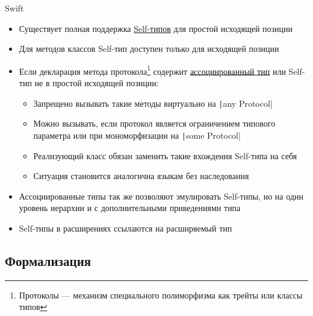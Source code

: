 \documentclass[aspectratio=169,usenames,dvipsnames]{beamer}
\begin{document}
    \begin{frame}{Swift}
        \begin{itemize}
            \item Существует полная поддержка \href{https://docs.swift.org/swift-book/documentation/the-swift-programming-language/types/\#Self-Type}{\color{blue}Self-типов} для простой исходящей позиции
            \item Для методов классов Self-тип доступен только для исходящей позиции
            \item Если декларация метода протокола\footnote{Протоколы --- механизм специального полиморфизма как трейты или классы типов} содержит \href{https://docs.swift.org/swift-book/documentation/the-swift-programming-language/generics/\#Associated-Types}{\color{blue}ассоциированный тип} или Self-тип не в простой исходящей позиции:
            \begin{itemize}
                \item Запрещено вызывать такие методы виртуально на \texttt|any Protocol|
                \item Можно вызывать, если протокол является ограничением типового параметра или при мономорфизации на \texttt|some Protocol|
                \item Реализующий класс обязан заменить такие вхождения Self-типа на себя
                \item Ситуация становится аналогична языкам без наследования
            \end{itemize}
            \item Ассоциированные типы так же позволяют эмулировать Self-типы, но на один уровень иерархии и с дополнительными приведениями типа
            \item Self-типы в расширениях ссылаются на расширяемый тип
        \end{itemize}
    \end{frame}


    \subsection{Формализация}
\end{document}

